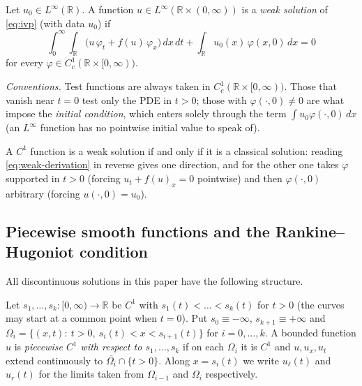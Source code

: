 \begin{definition}
\label{def:weak-solution}
Let $u_0\in L^\infty(\mathbb{R})$. A function $u \in
L^\infty(\mathbb{R}\times(0,\infty))$ is a \emph{weak solution} of
\eqref{eq:ivp} (with data $u_0$) if
\begin{equation}
  \label{eq:weak-formulation}
  \int_0^\infty\!\!\int_{\mathbb{R}} \big(u\,\varphi_t + f(u)\,\varphi_x\big)\, dx\, dt
  + \int_{\mathbb{R}} u_0(x)\, \varphi(x,0)\, dx = 0
\end{equation}
for every $\varphi \in C_c^1(\mathbb{R}\times[0,\infty))$.
\end{definition}

\noindent\emph{Conventions.} Test functions are always taken in
$C_c^1(\mathbb{R}\times[0,\infty))$. Those that vanish near $t=0$ test only
the PDE in $t>0$; those with $\varphi(\cdot,0)\ne0$ are what impose the
\emph{initial condition}, which enters solely through the term
$\int u_0\varphi(\cdot,0)\,dx$ (an $L^\infty$ function has no pointwise
initial value to speak of).

A $C^1$ function is a weak solution if and only if it is a classical solution:
reading \eqref{eq:weak-derivation} in reverse gives one direction, and for the
other one takes $\varphi$ supported in $t>0$ (forcing $u_t+f(u)_x=0$ pointwise)
and then $\varphi(\cdot,0)$ arbitrary (forcing $u(\cdot,0)=u_0$).

\subsection{Piecewise smooth functions and the Rankine--Hugoniot condition}
\label{subsec:rankine-hugoniot}

All discontinuous solutions in this paper have the following structure.

\begin{definition}
\label{def:piecewise}
Let $s_1,\dots,s_k:[0,\infty)\to\mathbb{R}$ be $C^1$ with $s_1(t)<\dots<
s_k(t)$ for $t>0$ (the curves may start at a common point when $t=0$).
Put $s_0\equiv-\infty$, $s_{k+1}\equiv+\infty$ and
$\Omega_i=\{(x,t):\ t>0,\ s_i(t)<x<s_{i+1}(t)\}$ for $i=0,\dots,k$. A
bounded function $u$ is \emph{piecewise $C^1$ with respect to
$s_1,\dots,s_k$} if on each $\Omega_i$ it is $C^1$ and $u,u_x,u_t$ extend
continuously to $\overline{\Omega_i}\cap\{t>0\}$. Along $x=s_i(t)$ we
write $u_\ell(t)$ and $u_r(t)$ for the limits taken from $\Omega_{i-1}$
and $\Omega_i$ respectively.
\end{definition}

